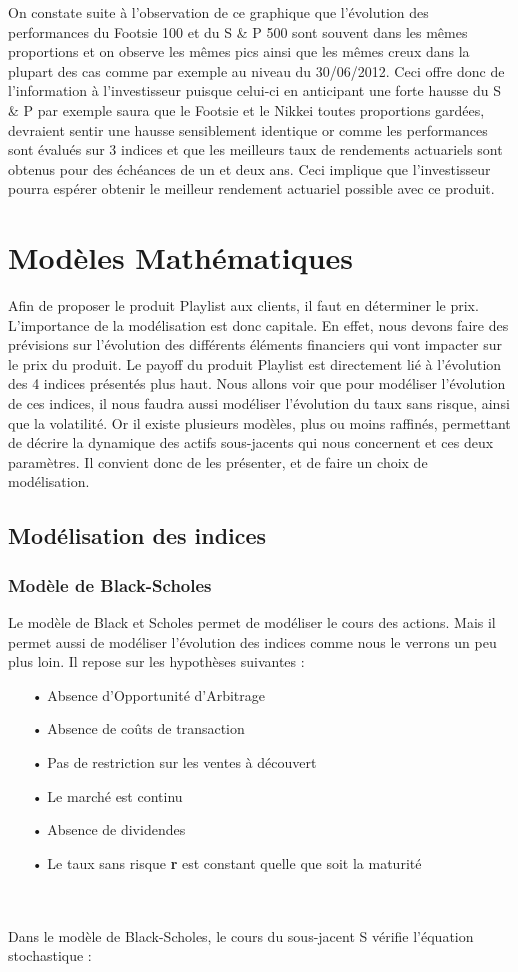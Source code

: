 \documentclass[french,12pt,a4paper]{article}
\begin{document}
On constate suite à l'observation de ce graphique que l'évolution des performances du Footsie 100 et du S \& P 500 sont souvent dans les mêmes proportions et on observe les mêmes pics ainsi que les mêmes creux dans la plupart des cas comme par exemple au niveau du 30/06/2012.
Ceci offre donc de l'information à l'investisseur puisque celui-ci en anticipant une forte hausse du S \& P par exemple saura que le Footsie et le Nikkei toutes proportions gardées, devraient sentir une hausse sensiblement identique or comme les performances sont évalués sur 3 indices et que les meilleurs taux de rendements actuariels sont obtenus pour des échéances de un et deux ans. Ceci implique que l'investisseur pourra espérer obtenir le meilleur rendement actuariel possible avec ce produit.

\newpage



\section{Modèles Mathématiques}
Afin de proposer le produit Playlist aux clients, il faut en déterminer le prix. L'importance de la modélisation est donc capitale. En effet, nous devons faire des prévisions sur l'évolution des différents éléments financiers qui vont impacter sur le prix du produit. Le payoff du produit Playlist est directement lié à l'évolution des 4 indices présentés plus haut. Nous allons voir que pour modéliser l'évolution de ces indices, il nous faudra aussi modéliser l'évolution du taux sans risque, ainsi que la volatilité. Or il existe plusieurs modèles, plus ou moins raffinés, permettant de décrire la dynamique des actifs sous-jacents qui nous concernent et ces deux paramètres. Il convient donc de les présenter, et de faire un choix de modélisation.

\subsection{Modélisation des indices}

\subsubsection{Modèle de Black-Scholes}
Le modèle de Black et Scholes permet de modéliser le cours des actions. Mais il permet aussi de modéliser l'évolution des indices comme nous le verrons un peu plus loin. Il repose sur les hypothèses suivantes :
\begin{itemize}
\item[•] Absence d'Opportunité d'Arbitrage
\item[•] Absence de coûts de transaction
\item[•] Pas de restriction sur les ventes à découvert
\item[•] Le marché est continu
\item[•] Absence de dividendes
\item[•] Le taux sans risque \textbf{r} est constant quelle que soit la maturité
\end{itemize}
\\ \\
Dans le modèle de Black-Scholes, le cours du sous-jacent S vérifie l'équation stochastique :
\end{document}

